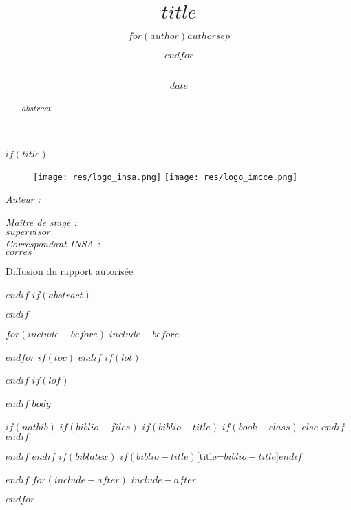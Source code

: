 \documentclass[$if(fontsize)$$fontsize$,$endif$$if(lang)$$lang$,$endif$$if(papersize)$$papersize$,$endif$$for(classoption)$$classoption$$sep$,$endfor$]{$documentclass$}
\title{ 
		\HRule{0.5pt} \\ [0.5cm]
        \LARGE \textbf{\uppercase{$title$}}
        \HRule{0.5pt} \\ [0.5cm]
        \vspace*{2\baselineskip}
		}
\author{$for(author)$$author$$sep$ \and $endfor$ \\\vspace{0.5em}{\large $school$} \\\vspace{0.5em}{\large $dpt$}}
\date{$date$}
\makeatletter
\renewcommand*{\maketitle}{
\begin{titlepage}
	\begin{figure}[tbp]\centering
            \texttt{[image: res/logo\_insa.png]}	
        \hfill
            \texttt{[image: res/logo\_imcce.png]}
		\vspace{3cm}
	\end{figure}
	
	\begin{center}
		\@date 
		{\LARGE\@title\unskip\strut\par} \vspace{2cm}

	\begin{minipage}[t]{0.3\textwidth}
	\begin{flushleft} \large
		\emph{Auteur :}\\
		\@author 
	\end{flushleft}
	\end{minipage}
	\begin{minipage}[t]{0.6\textwidth}
	\begin{flushright} \large
		\emph{Maître de stage :} \\
		$supervisor$ \\
		\vspace{1em}
		\emph{Correspondant INSA :} \\
		$corres$
	\end{flushright}
	\end{minipage}

	\vfill

	{\large Diffusion du rapport autorisée}

	\end{center}
	
\end{titlepage}
}
\makeatother
\begin{document}
{}

$if(title)$
\maketitle
$endif$
$if(abstract)$
\begin{abstract}
$abstract$
\end{abstract}
$endif$

$for(include-before)$
$include-before$

{}

$endfor$
$if(toc)$
{
\hypersetup{linkcolor=black}
\setcounter{tocdepth}{$toc-depth$}
\tableofcontents
}
$endif$
$if(lot)$
\listoftables
$endif$
$if(lof)$
\listoffigures
$endif$
$body$

$if(natbib)$
$if(biblio-files)$
$if(biblio-title)$
$if(book-class)$
\renewcommand\bibname{$biblio-title$}
$else$
\renewcommand\refname{$biblio-title$}
$endif$
$endif$


$endif$
$endif$
$if(biblatex)$
\printbibliography$if(biblio-title)$[title=$biblio-title$]$endif$

$endif$
$for(include-after)$
$include-after$

$endfor$
\end{document}
